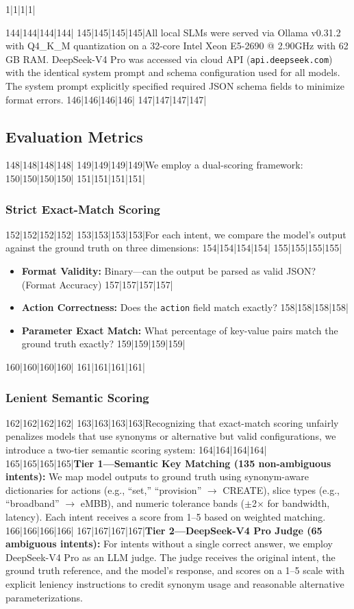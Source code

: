 1|1|1|1|\documentclass[10pt,conference]{IEEEtran}
\begin{document}
144|144|144|144|
145|145|145|145|All local SLMs were served via Ollama v0.31.2 with Q4\_K\_M quantization on a 32-core Intel Xeon E5-2690 @ 2.90GHz with 62 GB RAM. DeepSeek-V4 Pro was accessed via cloud API (\texttt{api.deepseek.com}) with the identical system prompt and schema configuration used for all models. The system prompt explicitly specified required JSON schema fields to minimize format errors.
146|146|146|146|
147|147|147|147|\subsection{Evaluation Metrics}
148|148|148|148|
149|149|149|149|We employ a dual-scoring framework:
150|150|150|150|
151|151|151|151|\subsubsection{Strict Exact-Match Scoring}
152|152|152|152|
153|153|153|153|For each intent, we compare the model's output against the ground truth on three dimensions:
154|154|154|154|
155|155|155|155|\begin{itemize}
156|156|156|156|    \item \textbf{Format Validity:} Binary---can the output be parsed as valid JSON? (Format Accuracy)
157|157|157|157|    \item \textbf{Action Correctness:} Does the \texttt{action} field match exactly?
158|158|158|158|    \item \textbf{Parameter Exact Match:} What percentage of key-value pairs match the ground truth exactly?
159|159|159|159|\end{itemize}
160|160|160|160|
161|161|161|161|\subsubsection{Lenient Semantic Scoring}
162|162|162|162|
163|163|163|163|Recognizing that exact-match scoring unfairly penalizes models that use synonyms or alternative but valid configurations, we introduce a two-tier semantic scoring system:
164|164|164|164|
165|165|165|165|\textbf{Tier 1---Semantic Key Matching (135 non-ambiguous intents):} We map model outputs to ground truth using synonym-aware dictionaries for actions (e.g., ``set,'' ``provision'' $\rightarrow$ CREATE), slice types (e.g., ``broadband'' $\rightarrow$ eMBB), and numeric tolerance bands ($\pm$2$\times$ for bandwidth, latency). Each intent receives a score from 1--5 based on weighted matching.
166|166|166|166|
167|167|167|167|\textbf{Tier 2---DeepSeek-V4 Pro Judge (65 ambiguous intents):} For intents without a single correct answer, we employ DeepSeek-V4 Pro as an LLM judge. The judge receives the original intent, the ground truth reference, and the model's response, and scores on a 1--5 scale with explicit leniency instructions to credit synonym usage and reasonable alternative parameterizations.
\end{document}
